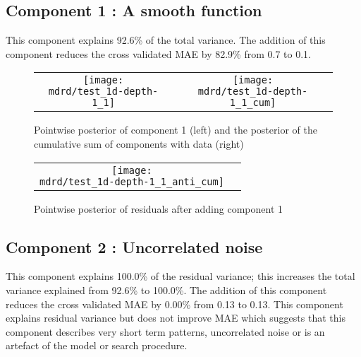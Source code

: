 \documentclass{article} %
\begin{document}
\subsection{Component 1 : A smooth function}



This component explains 92.6\% of the total variance.
The addition of this component reduces the cross validated MAE by 82.9\% from 0.7 to 0.1.


\begin{figure}[H]
\newcommand{\wmgd}{0.5\columnwidth}
\newcommand{\hmgd}{3.0cm}
\newcommand{\mdrd}{test_1d-depth-1}
\newcommand{\mbm}{\hspace{-0.3cm}}
\begin{tabular}{cc}
\mbm \texttt{[image: \\mdrd/test\_1d-depth-1\_1]} & \texttt{[image: \\mdrd/test\_1d-depth-1\_1\_cum]}
\end{tabular}
\caption{Pointwise posterior of component 1 (left) and the posterior of the cumulative sum of components with data (right)}
\label{fig:comp1}
\end{figure}

\begin{figure}[H]
\newcommand{\wmgd}{0.5\columnwidth}
\newcommand{\hmgd}{3.0cm}
\newcommand{\mdrd}{test_1d-depth-1}
\newcommand{\mbm}{\hspace{-0.3cm}}
\begin{tabular}{cc}
\mbm \texttt{[image: \\mdrd/test\_1d-depth-1\_1\_anti\_cum]}
\end{tabular}
\caption{Pointwise posterior of residuals after adding component 1}
\label{fig:comp1}
\end{figure}

\subsection{Component 2 : Uncorrelated noise}



This component explains 100.0\% of the residual variance; this increases the total variance explained from 92.6\% to 100.0\%.
The addition of this component reduces the cross validated MAE by 0.00\% from 0.13 to 0.13.
This component explains residual variance but does not improve MAE which suggests that this component describes very short term patterns, uncorrelated noise or is an artefact of the model or search procedure.
\end{document}
